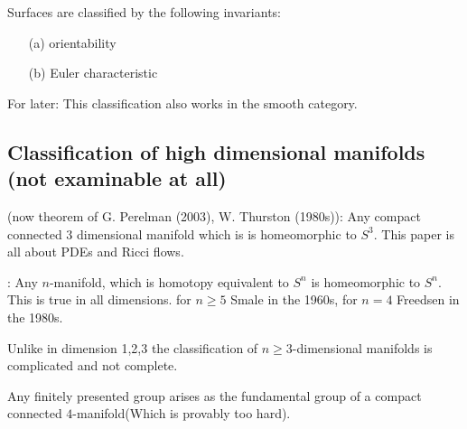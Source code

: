 \begin{remark}
    Surfaces are classified by the following invariants:
    \begin{enumerate}
        \item[(a)] orientability
        \item[(b)] Euler characteristic   
    \end{enumerate}
    For later: This classification also works in the smooth category.
\end{remark}

\subsection{Classification of high dimensional manifolds (not examinable at all)}

 (now theorem of G. Perelman (2003), W. Thurston (1980s)):
Any compact connected \(3\) dimensional manifold which is 
is homeomorphic to \(S^3\). This paper is all about PDEs and Ricci flows. 

: Any \(n\)-manifold, which is homotopy equivalent to \(S^n\) 
is homeomorphic to \(S^n\). This is true in all dimensions. for \(n\geq 5\) Smale in the 1960s,
for \(n=4\) Freedsen in the 1980s.

Unlike in dimension 1,2,3 the classification of \(n\geq 3\)-dimensional manifolds is 
complicated and not complete.

\begin{example}
    Any finitely presented group arises as the fundamental group of a compact 
    connected \(4\)-manifold(Which is provably too hard). 
\end{example}







